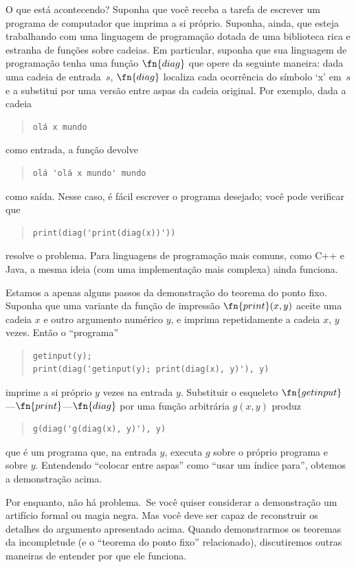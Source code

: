 \documentclass[../../../include/open-logic-section]{subfiles}
\begin{document}
\begin{explain}
O que está acontecendo? Suponha que você receba a tarefa de escrever
um programa de computador que imprima a si próprio. Suponha, ainda,
que esteja trabalhando com uma linguagem de programação dotada de uma
biblioteca rica e estranha de funções sobre cadeias. Em particular,
suponha que sua linguagem de programação tenha uma função $\fn{diag}$
que opere da seguinte maneira: dada uma cadeia de entrada~$s$,
$\fn{diag}$ localiza cada ocorrência do símbolo `x' em~$s$ e a substitui
por uma versão entre aspas da cadeia original. Por exemplo, dada a
cadeia
\begin{quote}
\begin{verbatim}
olá x mundo
\end{verbatim}
\end{quote}
como entrada, a função devolve
\begin{quote}
\begin{verbatim}
olá 'olá x mundo' mundo
\end{verbatim}
\end{quote}
como saída. Nesse caso, é fácil escrever o programa desejado; você
pode verificar que
\begin{quote}
\begin{verbatim}
print(diag('print(diag(x))'))
\end{verbatim}
\end{quote}
resolve o problema. Para linguagens de programação mais comuns, como
C++ e Java, a mesma ideia (com uma implementação mais complexa) ainda
funciona.

Estamos a apenas alguns passos da demonstração do teorema do ponto
fixo. Suponha que uma variante da função de impressão
$\fn{print}(x,y)$ aceite uma cadeia $x$ e outro argumento numérico $y$,
e imprima repetidamente a cadeia $x$, $y$ vezes. Então o ``programa''
\begin{quote}
\begin{verbatim}
getinput(y);
print(diag('getinput(y); print(diag(x), y)'), y)
\end{verbatim}
\end{quote}
imprime a si próprio $y$ vezes na entrada $y$. Substituir o esqueleto
$\fn{getinput}$---$\fn{print}$---$\fn{diag}$ por uma função arbitrária
$g(x,y)$ produz
\begin{quote}
\begin{verbatim}
g(diag('g(diag(x), y)'), y)
\end{verbatim}
\end{quote}
que é um programa que, na entrada $y$, executa $g$ sobre o próprio
programa e sobre $y$. Entendendo ``colocar entre aspas'' como ``usar
um índice para'', obtemos a demonstração acima.

Por enquanto, não há problema.\ Se você quiser considerar a demonstração
um artifício formal ou magia negra. Mas você deve ser capaz de
reconstruir os detalhes do argumento apresentado acima. Quando
demonstrarmos os teoremas da incompletude (e o ``teorema do ponto
fixo'' relacionado), discutiremos outras maneiras de entender por que
ele funciona.
\end{explain}
\end{document}
